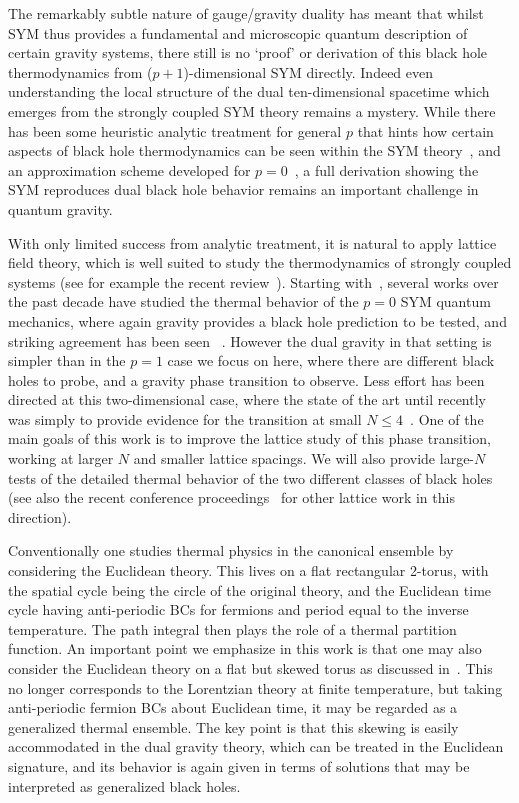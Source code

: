 The remarkably subtle nature of gauge/gravity duality has meant that whilst SYM thus provides a fundamental and microscopic quantum description of certain gravity systems, there still is no `proof' or derivation of this black hole thermodynamics from ($p + 1$)-dimensional SYM directly.
Indeed even understanding the local structure of the dual ten-dimensional spacetime which emerges from the strongly coupled SYM theory remains a mystery.
While there has been some heuristic analytic treatment for general $p$ that hints how certain aspects of black hole thermodynamics can be seen within the SYM theory~\cite{Smilga:2008bt, Wiseman:2013cda, Morita:2014ypa}, and an approximation scheme developed for $p = 0$~\cite{Kabat:1999hp, Kabat:2001ve, Kabat:2000zv, Lin:2013jra}, a full derivation showing the SYM reproduces dual black hole behavior remains an important challenge in quantum gravity.

With only limited success from analytic treatment, it is natural to apply lattice field theory, which is well suited to study the thermodynamics of strongly coupled systems (see for example the recent review~\cite{Hanada:2016jok}).
Starting with~\cite{Hanada:2007ti, Catterall:2007fp}, several works over the past decade have studied the thermal behavior of the $p = 0$ SYM quantum mechanics, where again gravity provides a black hole prediction to be tested, and striking agreement has been seen 
~\cite{Anagnostopoulos:2007fw, Hanada:2008gy, Hanada:2008ez, Hanada:2016zxj, Berkowitz:2016tyy, Berkowitz:2016jlq}.
However the dual gravity in that setting is simpler than in the $p = 1$ case we focus on here, where there are different black holes to probe, and a gravity phase transition to observe.
Less effort has been directed at this two-dimensional case, where the state of the art until recently was simply to provide evidence for the transition at small $N \le 4$~\cite{Catterall:2010fx}.
One of the main goals of this work is to improve the lattice study of this phase transition, working at larger $N$ and smaller lattice spacings.
We will also provide large-$N$ tests of the detailed thermal behavior of the two different classes of black holes (see also the recent conference proceedings~\cite{Kadoh:2016eju, Kadoh:2017mcj} for other lattice work in this direction).

Conventionally one studies thermal physics in the canonical ensemble by considering the Euclidean theory.
This lives on a flat rectangular 2-torus, with the spatial cycle being the circle of the original theory, and the Euclidean time cycle having anti-periodic BCs for fermions and period equal to the inverse temperature.
The path integral then plays the role of a thermal partition function.
An important point we emphasize in this work is that one may also consider the Euclidean theory on a flat but skewed torus as discussed in~\cite{Aharony:2005ew}.
This no longer corresponds to the Lorentzian theory at finite temperature, but taking anti-periodic fermion BCs about Euclidean time, it may be regarded as a generalized thermal ensemble.
The key point is that this skewing is easily accommodated in the dual gravity theory, which can be treated in the Euclidean signature, and its behavior is again given in terms of solutions that may be interpreted as generalized black holes.


